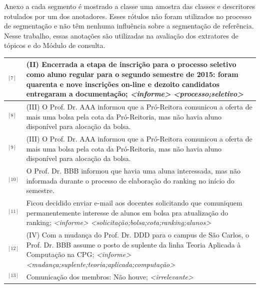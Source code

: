 Anexo a cada segmento é mostrado a classe uma amostra das classes e descritores rotulados por um dos anotadores. Esses rótulos não foram utilizados no processo de segmentação e não têm nenhuma influência sobre a segmentação de referência. Nesse trabalho, essas anotações são utilizadas na avaliação dos extratores de tópicos e do Módulo de consulta.

\begin{table}[!h]
	\centering 
\footnotesize
	\begin{tabular}{|p{0.2cm}p{}|} \hline


$^{[7]}$&
(II) Encerrada a etapa de inscrição para o processo seletivo como aluno regular para o segundo semestre de 2015: foram quarenta e nove inscrições on-line e dezoito candidatos entregaram a documentação; 
\textit{<informe>} \textit{<processo;seletivo>}
\\ \hline


$^{[8]}$ &
(III) O Prof. Dr. AAA informou que a Pró-Reitora comunicou a oferta de mais uma bolsa pela cota da Pró-Reitoria, mas não havia aluno disponível para alocação da bolsa.\\
$^{[9]}$ &
(III) O Prof. Dr. AAA informou que a Pró-Reitora comunicou a oferta de mais uma bolsa pela cota da Pró-Reitoria, mas não havia aluno disponível para alocação da bolsa.\\
$^{[10]}$ &
O Prof. Dr. BBB informou que havia uma aluna interessada, mas não informada durante o processo de elaboração do ranking no início do semestre.\\
$^{[11]}$ &
Ficou decidido enviar e-mail aos docentes solicitando que comuniquem permanentemente interesse de alunos em bolsa pra atualização do ranking;
\textit{<informe>} \textit{<solicitação;bolsa;cota;ranking;alunos>}
\\ \hline


$^{[12]}$ &
(IV) Com a mudança do Prof. Dr. DDD para o campus de São Carlos, o Prof. Dr. BBB assume o posto de suplente da linha Teoria Aplicada à Computação na CPG;
\textit{<informe>} \textit{<mudança;suplente;teoria;aplicada;computação>}
\\ \hline

$^{[13]}$ &
	Comunicação dos membros: Não houve;
	\textit{<irrelevante>} 
\\ \hline




\end{tabular}
\end{table}
